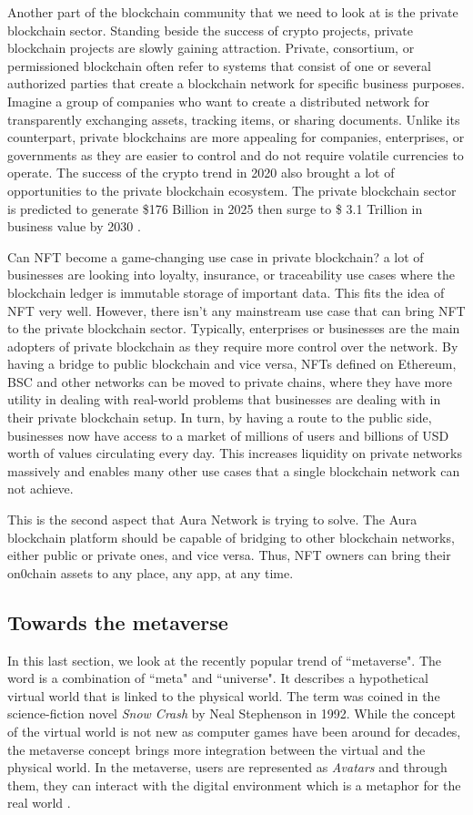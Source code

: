 \documentclass[12pt]{article}
\begin{document}
Another part of the blockchain community that we need to look at is the private blockchain sector. Standing beside the success of crypto projects, private blockchain projects are slowly gaining attraction. Private, consortium, or permissioned blockchain often refer to systems that consist of one or several authorized parties that create a blockchain network for specific business purposes. Imagine a group of companies who want to create a distributed network for transparently exchanging assets, tracking items, or sharing documents. Unlike its counterpart, private blockchains are more appealing for companies, enterprises, or governments as they are easier to control and do not require volatile currencies to operate. The success of the crypto trend in 2020 also brought a lot of opportunities to the private blockchain ecosystem. The private blockchain sector is predicted to generate \$176 Billion in 2025 then surge to  \$ 3.1 Trillion in business value by 2030 \cite{privatebc}. 

Can NFT become a game-changing use case in private blockchain? a lot of businesses are looking into loyalty, insurance, or traceability use cases where the blockchain ledger is immutable storage of important data. This fits the idea of NFT very well. However, there isn't any mainstream use case that can bring NFT to the private blockchain sector. Typically, enterprises or businesses are the main adopters of private blockchain as they  require more control over the network. By having a bridge to public blockchain and vice versa, NFTs defined on Ethereum, BSC and other networks can be moved to private chains, where they have more utility in dealing with real-world problems that businesses are dealing with in their private blockchain setup. In turn, by having a route to the public side, businesses now have access to a market of millions of users and billions of USD worth of values circulating every day. This increases liquidity on private networks massively and enables many other use cases that a single blockchain network can not achieve.

This is the second aspect that Aura Network is trying to solve. The Aura blockchain platform should be capable of bridging to other blockchain networks, either public or private ones, and vice versa. Thus, NFT owners can bring their on0chain assets to any place, any app, at any time. 

\subsection{Towards the metaverse}
In this last section, we look at the recently popular trend of ``metaverse". The word is a combination of ``meta" and ``universe". It describes a hypothetical virtual world that is linked to the physical world. The term was coined in the science-fiction novel \emph{Snow Crash} by Neal Stephenson in 1992. While the concept of the virtual world is not new as computer games have been around for decades, the metaverse concept brings more integration between the virtual and the physical world. In the metaverse, users are represented as \emph{Avatars} and through them, they can interact with the digital environment which is a metaphor for the real world \cite{lee2021all}.
\end{document}
